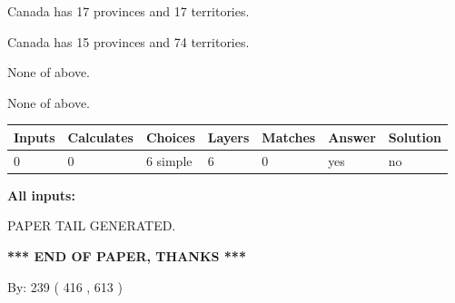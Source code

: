 \documentclass[12pt]{article}
\begin{document}
 
Canada has  17 provinces and  17 territories.
 
 
Canada has  15 provinces and  74 territories.
 
 
 None of above.
 
 
\noindent{}
 
 
 None of above.
 
 
\noindent{}
 
 
   
   
   
   
\noindent\begin{tabular}{|l|l|l|l|l|l|l|}
 \hline
Inputs & Calculates & Choices & Layers & Matches & Answer & Solution \\ \hline
 0  & 
 0  & 
 6
  simple  
  & 
 6  & 
 0  & 
  yes & 
  no 
  \\ \hline
 \end{tabular}
   
   
   
   
\noindent{}
   
   
   
   
\noindent\vspace{0.1in}\hspace{-0.08in} {\textbf{\Large{All inputs: }}}
   
   
   
   
   
   
 \vspace{0.2in}
 
   
   
\vspace{2.0in} PAPER TAIL GENERATED.
   
   
   
   
\vspace{1.0in} 
{\textbf{\large{ *** END OF PAPER, THANKS *** }}} 
   
   
\hspace{1.0in} By: 
 239 ( 416 ,  613 )
   
   
   
   
\newpage 
\setcounter{page}{ 
   451001 } 
   
   
   
\end{document}
